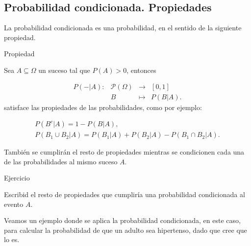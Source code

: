 \documentclass[
  letterpaper,
  DIV=11,
  numbers=noendperiod]{scrreprt}
\begin{document}
\subsection{Probabilidad condicionada.
Propiedades}\label{probabilidad-condicionada.-propiedades}

La probabilidad condicionada es una probabilidad, en el sentido de la
siguiente propiedad.

\begin{Proposicion}{Propiedad}{}

Sea \(A\subseteq \Omega\) un suceso tal que \(P(A)>0\), entonces

\[
\begin{array}{rccl}
P(-|A):& \mathcal{P}(\Omega) & \to & [0,1]\\
&B & \mapsto & P(B|A).
\end{array}
\] satisface las propiedades de las probabilidades, como por ejemplo:

\[
\begin{array}{l}
P(B^c|A)=1-P(B|A),\\
P(B_1\cup B_2|A)=P(B_1|A)+P(B_2|A)-P(B_1\cap B_2|A).
\end{array}
\]

\end{Proposicion}

También se cumplirán el resto de propiedades mientras se condicionen
cada una de las probabilidades al mismo suceso \(A\).

\begin{Ejercicio}{Ejercicio}{}

Escribid el resto de propiedades que cumpliría una probabilidad
condicionada al evento \(A\).

\end{Ejercicio}

Veamos un ejemplo donde se aplica la probabilidad condicionada, en este
caso, para calcular la probabilidad de que un adulto sea hipertenso,
dado que cree que lo es.
\end{document}
